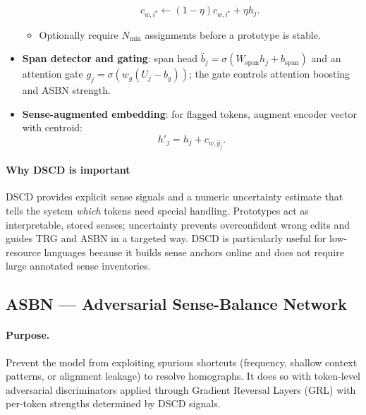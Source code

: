 \documentclass[11pt]{article}
\begin{document}
\begin{itemize}
\begin{itemize}
      \[
      c_{w,i^\star}\leftarrow(1-\eta)c_{w,i^\star}+\eta h_j.
      \]
      \item Optionally require $N_{\min}$ assignments before a prototype is stable.
    \end{itemize}
  \item \textbf{Span detector and gating}: span head $\hat b_j=\sigma(W_{\text{span}}h_j+b_{\text{span}})$ and an attention gate $g_j=\sigma(w_g(U_j-b_g))$; the gate controls attention boosting and ASBN strength.
  \item \textbf{Sense-augmented embedding}: for flagged tokens, augment encoder vector with centroid:
    \[
    h'_j = h_j + c_{w,\hat y_j}.
    \]
\end{itemize}

\paragraph{Why DSCD is important}
DSCD provides explicit sense signals and a numeric uncertainty estimate that tells the system \emph{which} tokens need special handling. Prototypes act as interpretable, stored senses; uncertainty prevents overconfident wrong edits and guides TRG and ASBN in a targeted way. DSCD is particularly useful for low-resource languages because it builds sense anchors online and does not require large annotated sense inventories.

\subsection{ASBN — Adversarial Sense-Balance Network}
\paragraph{Purpose.} Prevent the model from exploiting spurious shortcuts (frequency, shallow context patterns, or alignment leakage) to resolve homographs. It does so with token-level adversarial discriminators applied through Gradient Reversal Layers (GRL) with per-token strengths determined by DSCD signals.
\end{document}
